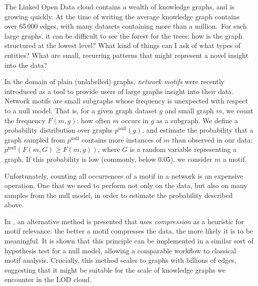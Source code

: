 \documentclass[11pt]{article}
\begin{document}
\noindent The Linked Open Data cloud contains a wealth of knowledge graphs, and is growing quickly. At the time of writing the average knowledge graph contains over 65\,000 edges, with many datasets containing more than a million.\footnotemark~For such large graphs, it can be difficult to see the forest for the trees: how is the graph structured at the lowest level? What kind of things can I ask of what types of entities? What are small, recurring patterns that might represent a novel insight into the data?


In the domain of plain (unlabelled) graphs, \emph{network motifs} \cite{milo2002network} were recently introduced as a tool to provide users of large graphs insight into their data. Network motifs are small subgraphs whose frequency is unexpected with respect to a null model. That is, for a given graph dataset $g$ and small graph $m$, we count the frequency $F(m, g)$: how often $m$ occurs in $g$ as a subgraph. We define a probability distribution over graphs $p^\text{null}(g)$, and estimate the probability that a graph sampled from $p^\text{null}$ contains more instances of $m$ than observed in our data: $p^\text{null}(F(m, G) \geq F(m, g))$, where $G$ is a random variable representing a graph. If this probability is low (commonly, below 0.05), we consider $m$ a motif. \footnotemark

Unfortunately, counting all occurrences of a motif in a network is an expensive operation. One that we need to perform not only on the data, but also on many samples from the null model, in order to estimate the probability described above.


In \cite{bloem2017large}, an alternative method is presented that uses \emph{compression} as a heuristic for motif relevance: the better a motif compresses the data, the more likely it is to be meaningful. It is shown that this principle can be implemented in a similar sort of hypothesis test for a null model, allowing a comparable workflow to classical motif analysis. Crucially, this method scales to graphs with billions of edges, suggesting that it might be suitable for the scale of knowledge graphs we encounter in the LOD cloud.
\end{document}
